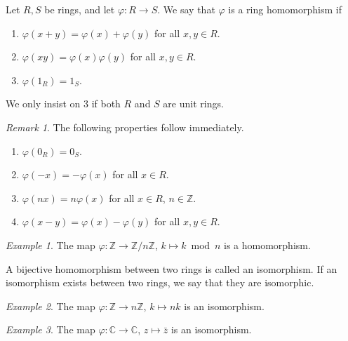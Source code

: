 \documentclass[11pt]{article}
\newcommand{\C}{\mathbb{C}}
\newcommand{\Z}{\mathbb{Z}}
\theoremstyle{definition}
\theoremstyle{remark}
\newtheorem*{remark}{Remark}
\newtheorem*{example}{Example}
\numberwithin{equation}{section}
\begin{document}
    \begin{definition}
        Let $R, S$ be rings, and let $\varphi\colon R \to S$. We say that $\varphi$
        is a ring homomorphism if 
        \begin{enumerate}
            \itemsep0em
            \item $\varphi(x + y) = \varphi(x) + \varphi(y)$ for all $x, y \in R$.
            \item $\varphi(xy) = \varphi(x)\varphi(y)$ for all $x, y \in R$.
            \item $\varphi(1_R) = 1_S$.
        \end{enumerate}
        We only insist on 3 if both $R$ and $S$ are unit rings.
        \begin{remark}
            The following properties follow immediately.
            \begin{enumerate}
                \itemsep0em
                \item $\varphi(0_R) = 0_S$.
                \item $\varphi(-x) = -\varphi(x)$ for all $x \in R$.
                \item $\varphi(nx) = n\varphi(x)$ for all $x \in R$, $n \in \Z$.
                \item $\varphi(x - y) = \varphi(x) - \varphi(y)$ for all $x, y \in R$.
            \end{enumerate}
        \end{remark}
    \end{definition}

    \begin{example}
        The map $\varphi\colon \Z \to \Z/n\Z$, $k \mapsto k \bmod{n}$ is a
        homomorphism.
    \end{example}

    \begin{definition}
        A bijective homomorphism between two rings is called an isomorphism. If an
        isomorphism exists between two rings, we say that they are isomorphic.
    \end{definition}

    \begin{example}
        The map $\varphi\colon \Z \to n\Z$, $k \mapsto nk$ is an isomorphism.
    \end{example}
    \begin{example}
        The map $\varphi\colon \C \to \C$, $z \mapsto \bar{z}$ is an isomorphism.
    \end{example}
\end{document}
